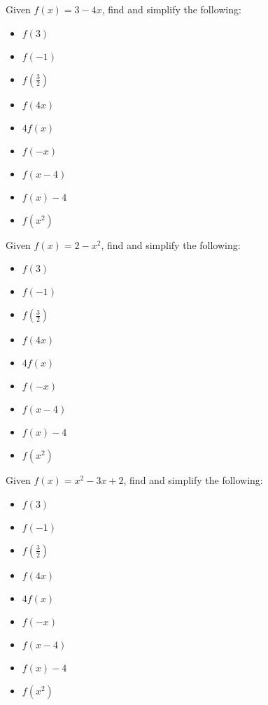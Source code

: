 \documentclass{ximera}
\begin{document}
\begin{problem}
Given $f(x) = 3 - 4x$,
find and simplify the following:

\begin{itemize}
\item $f(3)$
\item $f(-1)$
\item $f\left(\frac{3}{2} \right)$

\item  $f(4x)$
\item $4f(x)$
\item $f(-x)$

\item  $f(x-4)$
\item $f(x) - 4$
\item  $f\left(x^2\right)$
\end{itemize}
\end{problem}  






\begin{problem}
Given $f(x) = 2 - x^2$,
find and simplify the following:

\begin{itemize}
\item $f(3)$
\item $f(-1)$
\item $f\left(\frac{3}{2} \right)$

\item  $f(4x)$
\item $4f(x)$
\item $f(-x)$

\item  $f(x-4)$
\item $f(x) - 4$
\item  $f\left(x^2\right)$
\end{itemize}
\end{problem}  


\begin{problem}
Given $f(x) = x^2 - 3x + 2$,
find and simplify the following:

\begin{itemize}
\item $f(3)$
\item $f(-1)$
\item $f\left(\frac{3}{2} \right)$

\item  $f(4x)$
\item $4f(x)$
\item $f(-x)$

\item  $f(x-4)$
\item $f(x) - 4$
\item  $f\left(x^2\right)$
\end{itemize}
\end{problem}  
\end{document}
